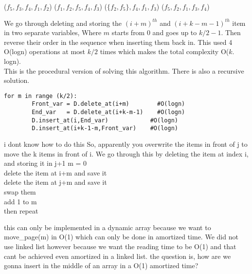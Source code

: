 \begin{problems}


\problem  %

\begin{problemparts}
\problempart %
	($f_5,f_3, f_4,f_1,f_2$)
\problempart %
	($f_1,f_2, f_5,f_4,f_3$)
\problempart %
	($\{f_2,f_5\}, f_4,f_1,f_3$)
\problempart %
	($f_5,f_2, f_1,f_3,f_4$)

\end{problemparts}
\medskip
\problem  %

\begin{problemparts}
\problempart %
	{We go through deleting and storing the $(i+m)^{th}$ and $(i+k-m-1)^{th}$ item in two separate variables, Where $m$ starts from $0$ and goes up to $k/2-1$. Then reverse their order in the sequence when inserting them back in. This used 4 O(logn) operations at most $k/2$ times which makes the total complexity O($k.$logn).}\\
	This is the procedural version of solving this algorithm. There is also a recursive solution.
	
\begin{lstlisting}
for m in range (k/2):
		Front_var = D.delete_at(i+m)        #O(logn)
		End_var   = D.delete_at(i+k-m-1)    #O(logn)
		D.insert_at(i,End_var)            #O(logn)
		D.insert_at(i+k-1-m,Front_var)    #O(logn)
\end{lstlisting}
	

	
\problempart %
i dont know how to do this
So, apparently you overwrite the items in front of j to move the k items in front of i.
	We go through this by deleting the item at index i, and storing it in j+1
m = 0
\\delete the item at i+m and save it
\\delete the item at j+m and save it
\\swap them
\\add 1 to m
\\then repeat

\end{problemparts}



\newpage
\problem  %
this can only be implemented in a dynamic array because we want to move\_page(m) in O(1) which can only be done in amortized time. We did not use linked list however because we want the reading time to be O(1) and that cant be achieved even amortized in a linked list.
the question is, how are we gonna insert in the middle of an array in a O(1) amortized time?


\end{problems}
